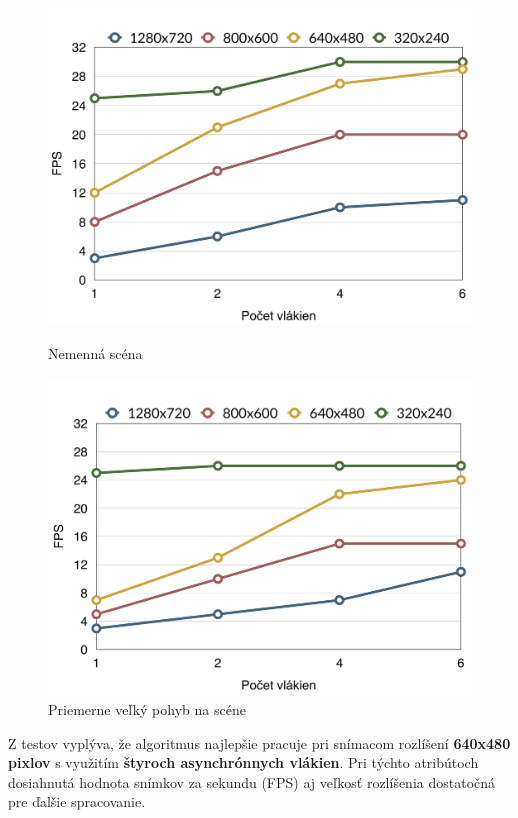 \begin{figure}[H]
  \centering
  \begin{minipage}[b]{0.49\textwidth}
    \includegraphics[width=\textwidth]{obrazky/substractorCalm}
    \caption{Nemenná scéna}
  \end{minipage}
  \hfill
  \begin{minipage}[b]{0.49\textwidth}
    \includegraphics[width=\textwidth]{obrazky/substractorNormal}
    \caption{Priemerne veľký pohyb na scéne}
  \end{minipage}
\end{figure}

Z testov vyplýva, že algoritmus najlepšie pracuje pri snímacom rozlíšení \textbf{640x480 pixlov} s využitím \textbf{štyroch asynchrónnych vlákien}. Pri týchto atribútoch dosiahnutá hodnota snímkov za sekundu (FPS) aj veľkosť rozlíšenia dostatočná pre ďalšie spracovanie. 



